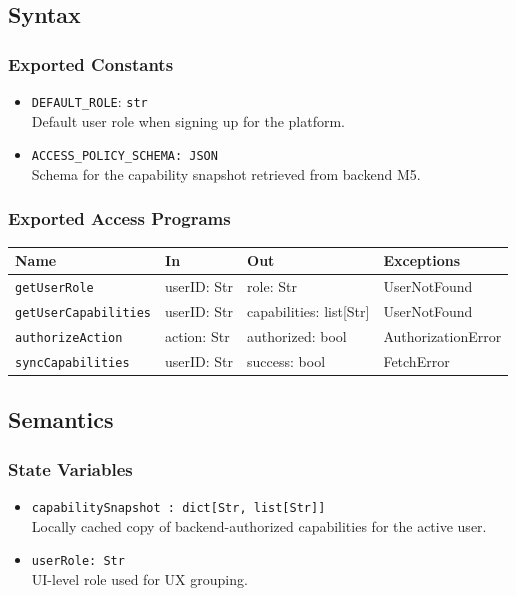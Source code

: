 \documentclass[12pt, titlepage]{article}
\begin{document}
\subsection{Syntax}

\subsubsection{Exported Constants}

\begin{itemize}
    \item \texttt{DEFAULT\_ROLE}: \texttt{str}\\
    Default user role when signing up for the platform.
    \item \texttt{ACCESS\_POLICY\_SCHEMA: JSON}\\
    Schema for the capability snapshot retrieved from backend M5.
\end{itemize}

\subsubsection{Exported Access Programs}

\begin{center}
\begin{tabular}{p{4cm} p{4cm} p{4cm} p{4cm}}
\hline
\textbf{Name} & \textbf{In} & \textbf{Out} & \textbf{Exceptions} \\
\hline
\texttt{getUserRole} & userID: Str & role: Str & UserNotFound \\
\texttt{getUserCapabilities} & userID: Str & capabilities: list[Str] & UserNotFound \\
\texttt{authorizeAction} & action: Str & authorized: bool & AuthorizationError\\
\texttt{syncCapabilities} & userID: Str & success: bool & FetchError \\
\hline
\end{tabular}
\end{center}

\subsection{Semantics}

\subsubsection{State Variables}

\begin{itemize}
    \item \texttt{capabilitySnapshot : dict[Str, list[Str]]}\\
    Locally cached copy of backend-authorized capabilities for the active user.
    \item \texttt{userRole: Str}\\
    UI-level role used for UX grouping.
\end{itemize}
\end{document}

